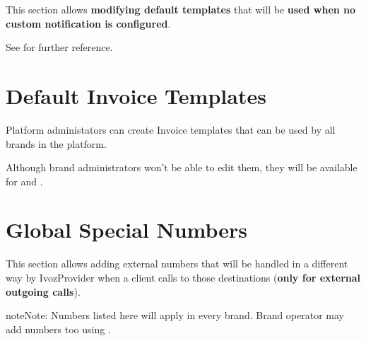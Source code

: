 \documentclass[letterpaper,10pt,english]{sphinxmanual}
\begin{document}
This section allows \textbf{modifying default templates} that will be \textbf{used when no custom notification is configured}.

See {\hyperref[administration_portal/brand/settings/notification_templates:notification\string-templates]{}} for further reference.


\section{Default Invoice Templates}
\label{administration_portal/platform/default_invoice_templates::doc}\label{administration_portal/platform/default_invoice_templates:default-invoice-templates}\label{administration_portal/platform/default_invoice_templates:id1}
Platform administators can create Invoice templates that can be used by all brands in the platform.

Although brand administrators won't be able to edit them, they will be available for {\hyperref[administration_portal/brand/invoicing/invoices:invoices]{}}
and {\hyperref[administration_portal/brand/invoicing/invoice_schedulers:invoice\string-schedulers]{}}.


\section{Global Special Numbers}
\label{administration_portal/platform/global_special_numbers:global-special-numbers}\label{administration_portal/platform/global_special_numbers::doc}
This section allows adding external numbers that will be handled in a different way by IvozProvider when a client
calls to those destinations (\textbf{only for external outgoing calls}).

\begin{notice}{note}{Note:}
Numbers listed here will apply in every brand. Brand operator may add numbers too using {\hyperref[administration_portal/brand/settings/special_numbers:special\string-numbers]{}}.
\end{notice}
\end{document}
